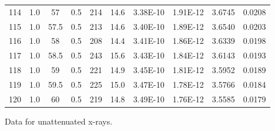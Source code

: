 \begin{maintable}[ht]
\begin{tabular}{cccccccccc}
114         & 1.0   & 57         & 0.5           & 214     & 14.6       & 3.38E-10    & 1.91E-12       & 3.6745    & 0.0208       \\
115         & 1.0   & 57.5       & 0.5           & 213     & 14.6       & 3.40E-10    & 1.89E-12       & 3.6540    & 0.0203       \\
116         & 1.0   & 58         & 0.5           & 208     & 14.4       & 3.41E-10    & 1.86E-12       & 3.6339    & 0.0198       \\
117         & 1.0   & 58.5       & 0.5           & 243     & 15.6       & 3.43E-10    & 1.84E-12       & 3.6143    & 0.0193       \\
118         & 1.0   & 59         & 0.5           & 221     & 14.9       & 3.45E-10    & 1.81E-12       & 3.5952    & 0.0189       \\
119         & 1.0   & 59.5       & 0.5           & 225     & 15.0       & 3.47E-10    & 1.78E-12       & 3.5766    & 0.0184       \\
120         & 1.0   & 60         & 0.5           & 219     & 14.8       & 3.49E-10    & 1.76E-12       & 3.5585    & 0.0179      
\end{tabular}
\caption{Data for unattenuated x-rays.}
\label{tab:xrcg3}
\end{maintable}



